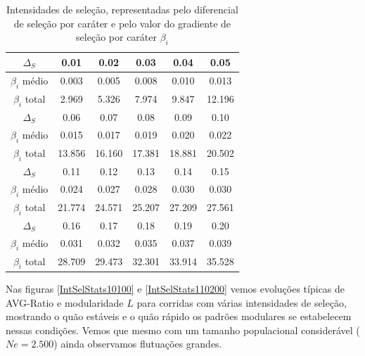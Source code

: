 \begin{table}[htbp]
    \centering
    \caption{Intensidades de seleção, representadas pelo diferencial de
        seleção por caráter e pelo valor do gradiente de seleção por caráter
    $\beta_i$}
    \label{tab:betas}
    \vspace{1em}
    \begin{tabular}{c|c|c|c|c|c}
        \toprule
        $\Delta_S$ & 0.01 & 0.02 & 0.03 & 0.04 & 0.05 \\
        \hline
        $\beta_i$ médio & 0.003 & 0.005 & 0.008 & 0.010 & 0.013 \\
         $\beta_i$ total & 2.969 & 5.326 & 7.974 & 9.847 & 12.196 \\
        \midrule
        \midrule
        $\Delta_S$ & 0.06 & 0.07 & 0.08 & 0.09 & 0.10 \\
        \hline
        $\beta_i$ médio & 0.015 & 0.017 & 0.019 & 0.020 & 0.022 \\
         $\beta_i$ total & 13.856 & 16.160 & 17.381 & 18.881 & 20.502 \\
        \midrule
        \midrule
        $\Delta_S$ & 0.11  & 0.12  & 0.13  & 0.14  & 0.15 \\ 
        \hline
        $\beta_i$ médio & 0.024 & 0.027 & 0.028 & 0.030 & 0.030 \\     
         $\beta_i$ total & 21.774 & 24.571 & 25.207 & 27.209 & 27.561 \\
        \midrule
        \midrule
        $\Delta_S$ & 0.16  & 0.17  & 0.18  & 0.19  & 0.20  \\ 
        \hline
        $\beta_i$ médio & 0.031 & 0.032 & 0.035 & 0.037 & 0.039 \\     
       $\beta_i$ total & 28.709 & 29.473 & 32.301 & 33.914 & 35.528 \\
        \bottomrule
    \end{tabular}
\end{table}

Nas figuras \ref{IntSelStats10100} e \ref{IntSelStats110200} vemos
evoluções típicas de AVG-Ratio e modularidade $L$ para corridas com
várias intensidades de seleção, mostrando o quão estáveis e o quão
rápido os padrões modulares se estabelecem nessas condições.
Vemos que mesmo com um tamanho populacional considerável ($Ne = 2.500$)
ainda observamos flutuações grandes.

